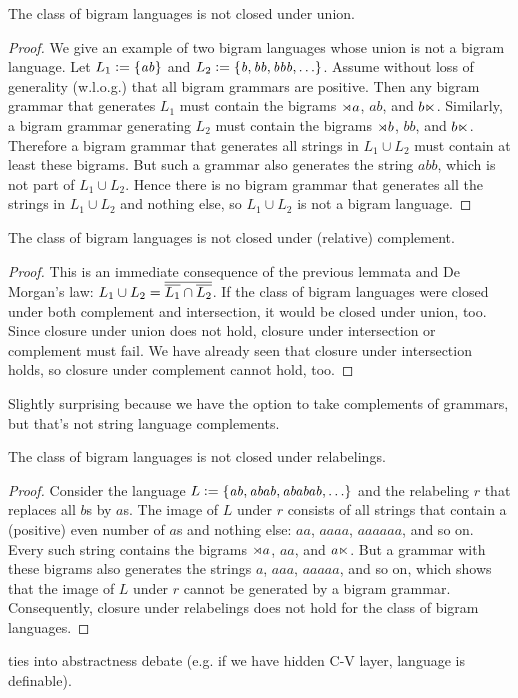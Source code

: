 \begin{lemma}
    The class of bigram languages is not closed under union. 
\end{lemma}
%
\begin{proof}
    We give an example of two bigram languages whose union is not a bigram language.
    Let $L_1 \mathrel{\mathop:}= \left \{ \mathit{ab} \right \}$ and $L_2 \mathrel{\mathop:}= \left \{ \mathit{b}, \mathit{bb}, \mathit{bbb}, \ldots \right \}$.
    Assume without loss of generality (w.l.o.g.) that all bigram grammars are positive.
    Then any bigram grammar that generates $L_1$ must contain the bigrams $\rtimes a$, $\mathit{ab}$, and $b \ltimes$.
    Similarly, a bigram grammar generating $L_2$ must contain the bigrams $\rtimes b$, $\mathit{bb}$, and $b \ltimes$.
    Therefore a bigram grammar that generates all strings in $L_1 \cup L_2$ must contain at least these bigrams.
    But such a grammar also generates the string $\mathit{abb}$, which is not part of $L_1 \cup L_2$.
    Hence there is no bigram grammar that generates all the strings in $L_1 \cup L_2$ and nothing else, so $L_1 \cup L_2$ is not a bigram language.
\end{proof}
%

\begin{lemma}
    The class of bigram languages is not closed under (relative) complement.
\end{lemma}
%
\begin{proof}
    This is an immediate consequence of the previous lemmata and De Morgan's law: $L_1 \cup L_2 =  \overline{ \overline{L_1}  \cap  \overline{L_2} } $.
    If the class of bigram languages were closed under both complement and intersection, it would be closed under union, too.
    Since closure under union does not hold, closure under intersection or complement must fail.
    We have already seen that closure under intersection holds, so closure under complement cannot hold, too.
\end{proof}
%
Slightly surprising because we have the option to take complements of grammars, but that's not string language complements.

\begin{lemma}
    The class of bigram languages is not closed under relabelings.
\end{lemma}
%
\begin{proof}
    Consider the language $L \mathrel{\mathop:}= \left \{ \mathit{ab}, \mathit{abab}, \mathit{ababab}, \ldots \right \}$ and the relabeling $r$ that replaces all $b$s by $a$s.
    The image of $L$ under $r$ consists of all strings that contain a (positive) even number of $a$s and nothing else: $\mathit{aa}$, $\mathit{aaaa}$, $\mathit{aaaaaa}$, and so on.
    Every such string contains the bigrams $\rtimes a$, $\mathit{aa}$, and $a \ltimes$.
    But a grammar with these bigrams also generates the strings $a$, $\mathit{aaa}$, $\mathit{aaaaa}$, and so on, which shows that the image of $L$ under $r$ cannot be generated by a bigram grammar.
    Consequently, closure under relabelings does not hold for the class of bigram languages.
\end{proof}
%
ties into abstractness debate (e.g. if we have hidden C-V layer, language is definable).

